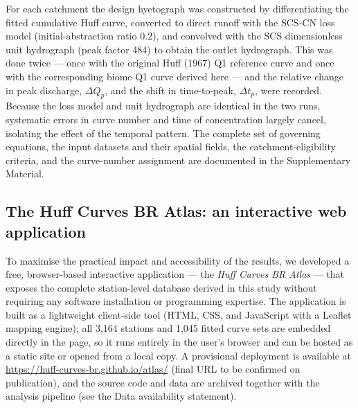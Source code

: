 \documentclass[a4paper,fleqn]{cas-sc}
\begin{document}
For each catchment the design hyetograph was constructed by
differentiating the fitted cumulative Huff curve, converted to direct
runoff with the SCS-CN loss model (initial-abstraction ratio 0.2), and
convolved with the SCS dimensionless unit hydrograph (peak factor 484)
to obtain the outlet hydrograph. This was done twice — once with the
original Huff (1967) Q1 reference curve and once with the
corresponding biome Q1 curve derived here — and the relative change in
peak discharge, $\Delta Q_p$, and the shift in time-to-peak,
$\Delta t_p$, were recorded. Because the loss model and unit hydrograph
are identical in the two runs, systematic errors in curve number and
time of concentration largely cancel, isolating the effect of the
temporal pattern. The complete set of governing equations, the input
datasets and their spatial fields, the catchment-eligibility criteria,
and the curve-number assignment are documented in the Supplementary
Material.

\subsection{The Huff Curves BR Atlas: an interactive web application}
\label{sec:webatlas}

To maximise the practical impact and accessibility of the results, we
developed a free, browser-based interactive application — the
\emph{Huff Curves BR Atlas} — that exposes the complete station-level
database derived in this study without requiring any software
installation or programming expertise. The application is built as a
lightweight client-side tool (HTML, CSS, and JavaScript with a Leaflet
mapping engine); all 3,164 stations and 1,045 fitted curve sets are
embedded directly in the page, so it runs entirely in the user's
browser and can be hosted as a static site or opened from a local
copy. A provisional deployment is available at
\url{https://huff-curves-br.github.io/atlas/} (final URL to be
confirmed on publication), and the source code and data are archived
together with the analysis pipeline (see the Data availability
statement).
\end{document}
